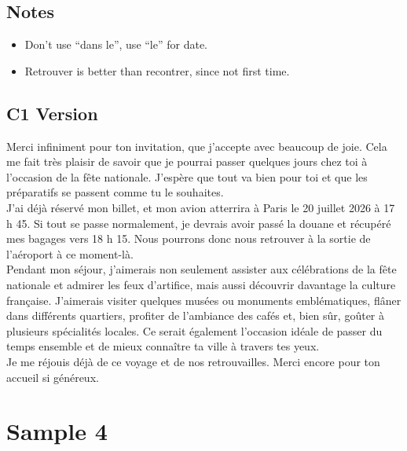 \documentclass{book}
\begin{document}
        \subsection*{Notes}
            \begin{itemize}
                \item Don't use ``dans le'', use ``le'' for date.
                \item Retrouver is better than recontrer, since not first time.
            \end{itemize}

        \subsection*{C1 Version}
            Merci infiniment pour ton invitation, que j'accepte avec beaucoup de joie. 
            Cela me fait très plaisir de savoir que je pourrai passer quelques jours chez toi à l'occasion de la fête nationale.
            J'espère que tout va bien pour toi et que les préparatifs se passent comme tu le souhaites.
            \\
            J'ai déjà réservé mon billet, et mon avion atterrira à Paris le 20 juillet 2026 à 17 h 45. 
            Si tout se passe normalement, je devrais avoir passé la douane et récupéré mes bagages vers 18 h 15. 
            Nous pourrons donc nous retrouver à la sortie de l'aéroport à ce moment-là.
            \\
            Pendant mon séjour, j'aimerais non seulement assister aux célébrations de la fête nationale et admirer les feux d'artifice, 
            mais aussi découvrir davantage la culture française. J'aimerais visiter quelques musées ou monuments emblématiques, flâner dans différents quartiers, 
            profiter de l'ambiance des cafés et, bien sûr, goûter à plusieurs spécialités locales. Ce serait également l'occasion idéale de passer du temps ensemble et de mieux connaître ta ville à travers tes yeux.
            \\
            Je me réjouis déjà de ce voyage et de nos retrouvailles. Merci encore pour ton accueil si généreux.

    \newpage
    \section{Sample 4} 
\end{document}
